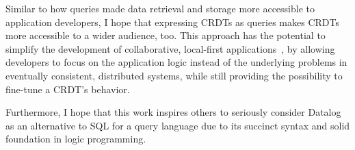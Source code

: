 Similar to how queries made data retrieval and storage more accessible to
application developers, I hope that expressing \acp{CRDT} as queries
makes \acp{CRDT} more accessible to a wider audience, too.
This approach has the potential to simplify the development of
collaborative, local-first applications~\cite{kleppmann2019local},
by allowing developers to focus on the application logic instead of the
underlying problems in eventually consistent, distributed systems, while
still providing the possibility to fine-tune a \ac{CRDT}'s behavior.

Furthermore, I hope that this work inspires others to seriously consider Datalog
as an alternative to SQL for a query language due to its succinct syntax
and solid foundation in logic programming.

